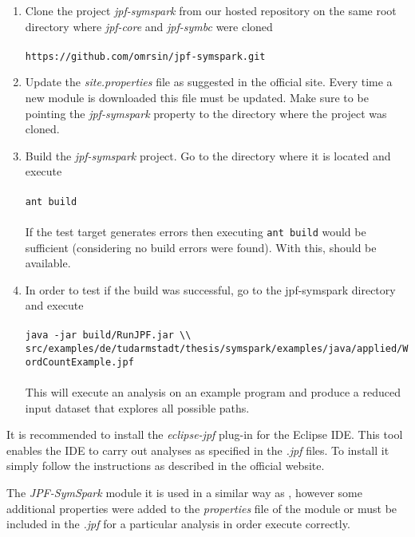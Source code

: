 \begin{enumerate}
	\item Clone the project \textit{jpf-symspark} from our hosted repository on the same root directory where \textit{jpf-core} and \textit{jpf-symbc} were cloned \\ \\
	\lstinline[]|https://github.com/omrsin/jpf-symspark.git|
	\item Update the \textit{site.properties} file as suggested in the official \jpf{} site. Every time a new module is downloaded this file must be updated. Make sure to be pointing the \textit{jpf-symspark} property to the directory where the project was cloned.	
	\item Build the \textit{jpf-symspark} project. Go to the directory where it is located and execute \\ \\		
	\lstinline[]|ant build| \\ \\
	If the test target generates errors then executing \lstinline[]|ant build| would be sufficient (considering no build errors were found). With this, \spf{} should be available.
	\item In order to test if the build was successful, go to the jpf-symspark directory and execute \\ \\
		\lstinline[]|java -jar build/RunJPF.jar \\| \\
		\hspace{2cm} \lstinline[]|src/examples/de/tudarmstadt/thesis/symspark/examples/java/applied/WordCountExample.jpf| \\ \\
	This will execute an analysis on an example program and produce a reduced input dataset that explores all possible paths.
\end{enumerate}

It is recommended to install the \textit{eclipse-jpf} plug-in for the Eclipse IDE. This tool enables the IDE to carry out analyses as specified in the \textit{.jpf} files. To install it simply follow the instructions as described in the official \jpf{} website. 


The \textit{JPF-SymSpark} module it is used in a similar way as \spf{}, however some additional properties were added to the \textit{properties} file of the module or must be included in the \textit{.jpf} for a particular analysis in order execute correctly.

